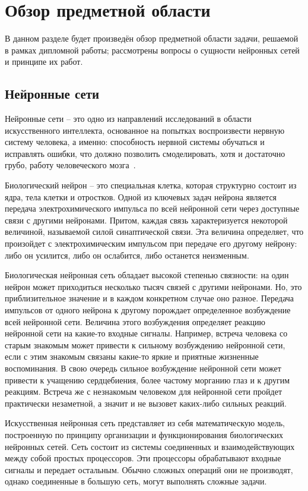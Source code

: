 \section{Обзор предметной области}
\label{sec:domain}

В данном разделе будет произведён обзор предметной области задачи, решаемой в рамках дипломной работы; рассмотрены вопросы о сущности нейронных сетей и принципе их работ.

\subsection{Нейронные сети}
\label{sub:domain:neuro_net}
Нейронные сети – это одно из направлений исследований в области искусственного интеллекта, основанное на попытках воспроизвести нервную систему человека, а именно: способность нервной системы обучаться и исправлять ошибки, что должно позволить смоделировать, хотя и достаточно грубо, работу человеческого мозга~\cite{domain_aiportal}.

Биологический нейрон – это специальная клетка, которая структурно состоит из ядра, тела клетки и отростков.
Одной из ключевых задач нейрона является передача электрохимического импульса по всей нейронной сети через доступные связи с другими нейронами.
Притом, каждая связь характеризуется некоторой величиной, называемой силой синаптической связи.
Эта величина определяет, что произойдет с электрохимическим импульсом при передаче его другому нейрону: либо он усилится, либо он ослабится, либо останется неизменным.

Биологическая нейронная сеть обладает высокой степенью связности: на один нейрон может приходиться несколько тысяч связей с другими нейронами.
Но, это приблизительное значение и в каждом конкретном случае оно разное.
Передача импульсов от одного нейрона к другому порождает определенное возбуждение всей нейронной сети.
Величина этого возбуждения определяет реакцию нейронной сети на какие-то входные сигналы.
Например, встреча человека со старым знакомым может привести к сильному возбуждению нейронной сети, если с этим знакомым связаны какие-то яркие и приятные жизненные воспоминания.
В свою очередь сильное возбуждение нейронной сети может привести к учащению сердцебиения, более частому морганию глаз и к другим реакциям.
Встреча же с незнакомым человеком для нейронной сети пройдет практически незаметной, а значит и не вызовет каких-либо сильных реакций.

Искусственная нейронная сеть представляет из себя математическую модель, построенную по принципу организации и функционирования биологических нейронных сетей.
Сеть состоит из системы соединенных и взаимодействующих между собой простых процессоров.
Эти процессоры обрабатывают входные сигналы и передает остальным.
Обычно сложных операций они не производят, однако соединенные в большую сеть, могут выполнять сложные задачи.


